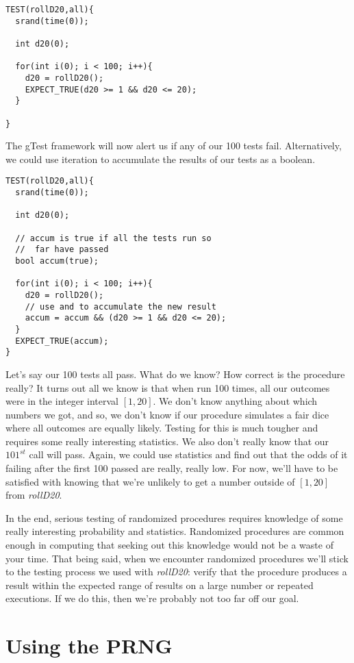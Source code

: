 \documentclass[]{tufte-handout}
\begin{document}
\begin{verbatim}
TEST(rollD20,all){
  srand(time(0));
  
  int d20(0);
  
  for(int i(0); i < 100; i++){
    d20 = rollD20();
    EXPECT_TRUE(d20 >= 1 && d20 <= 20);
  }
  
}
\end{verbatim}
The gTest framework will now alert us if any of our 100 tests fail.  Alternatively, we could use iteration to accumulate the results of our tests as a boolean.
\begin{verbatim}
TEST(rollD20,all){
  srand(time(0));

  int d20(0);

  // accum is true if all the tests run so
  //  far have passed
  bool accum(true);  
  
  for(int i(0); i < 100; i++){
    d20 = rollD20();
    // use and to accumulate the new result
    accum = accum && (d20 >= 1 && d20 <= 20);
  }
  EXPECT_TRUE(accum);  
}
\end{verbatim}

Let's say our 100 tests all pass. What do we know? How correct is the procedure really?  It turns out all we know is that when run 100 times, all our outcomes were in the integer interval $[1,20]$. We don't know anything about which numbers we got, and so, we don't know if our procedure simulates a fair dice where all outcomes are equally likely. Testing for this is much tougher and requires some really interesting statistics. We also don't really know that our $101^{st}$ call will pass. Again, we could use statistics and find out that the odds of it failing after the first 100 passed are really, really low. For now, we'll have to be satisfied with knowing that we're unlikely to get a number outside of $[1,20]$ from \textit{rollD20}. 

In the end, serious testing of randomized procedures requires knowledge of some really interesting probability and statistics.  Randomized procedures are common enough in computing that seeking out this knowledge would not be a waste of your time. That being said, when we encounter randomized procedures we'll stick to the testing process we used with \textit{rollD20}: verify that the procedure produces a result within the expected range of results on a large number or repeated executions. If we do this, then we're probably not too far off our goal.

\section{Using the PRNG}
\end{document}
